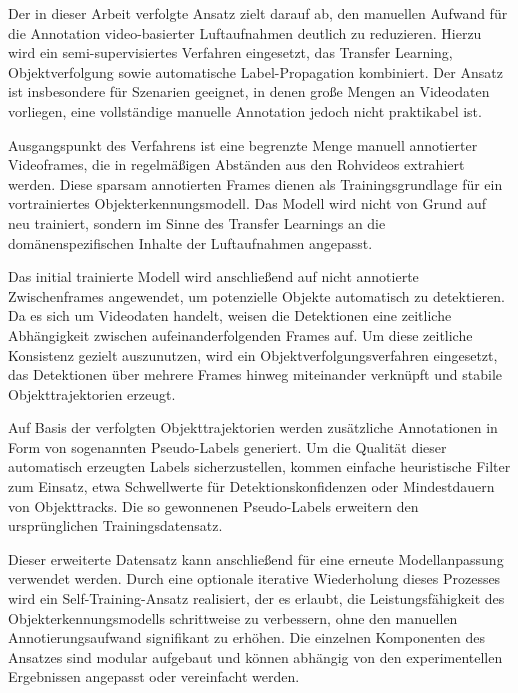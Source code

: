 Der in dieser Arbeit verfolgte Ansatz zielt darauf ab, den manuellen Aufwand für die 
Annotation video-basierter Luftaufnahmen deutlich zu reduzieren. Hierzu wird ein 
semi-supervisiertes Verfahren eingesetzt, das Transfer Learning, Objektverfolgung 
sowie automatische Label-Propagation kombiniert. Der Ansatz ist insbesondere für 
Szenarien geeignet, in denen große Mengen an Videodaten vorliegen, eine vollständige 
manuelle Annotation jedoch nicht praktikabel ist.

Ausgangspunkt des Verfahrens ist eine begrenzte Menge manuell annotierter Videoframes, 
die in regelmäßigen Abständen aus den Rohvideos extrahiert werden. Diese sparsam 
annotierten Frames dienen als Trainingsgrundlage für ein vortrainiertes 
Objekterkennungsmodell. Das Modell wird nicht von Grund auf neu trainiert, sondern im 
Sinne des Transfer Learnings an die domänenspezifischen Inhalte der Luftaufnahmen 
angepasst.

Das initial trainierte Modell wird anschließend auf nicht annotierte Zwischenframes 
angewendet, um potenzielle Objekte automatisch zu detektieren. Da es sich um 
Videodaten handelt, weisen die Detektionen eine zeitliche Abhängigkeit zwischen 
aufeinanderfolgenden Frames auf. Um diese zeitliche Konsistenz gezielt auszunutzen, 
wird ein Objektverfolgungsverfahren eingesetzt, das Detektionen über mehrere Frames 
hinweg miteinander verknüpft und stabile Objekttrajektorien erzeugt.

Auf Basis der verfolgten Objekttrajektorien werden zusätzliche Annotationen in Form 
von sogenannten Pseudo-Labels generiert. Um die Qualität dieser automatisch erzeugten 
Labels sicherzustellen, kommen einfache heuristische Filter zum Einsatz, etwa 
Schwellwerte für Detektionskonfidenzen oder Mindestdauern von Objekttracks. Die so 
gewonnenen Pseudo-Labels erweitern den ursprünglichen Trainingsdatensatz.

Dieser erweiterte Datensatz kann anschließend für eine erneute Modellanpassung 
verwendet werden. Durch eine optionale iterative Wiederholung dieses Prozesses wird 
ein Self-Training-Ansatz realisiert, der es erlaubt, die Leistungsfähigkeit des 
Objekterkennungsmodells schrittweise zu verbessern, ohne den manuellen 
Annotierungsaufwand signifikant zu erhöhen. Die einzelnen Komponenten des Ansatzes 
sind modular aufgebaut und können abhängig von den experimentellen Ergebnissen 
angepasst oder vereinfacht werden.


